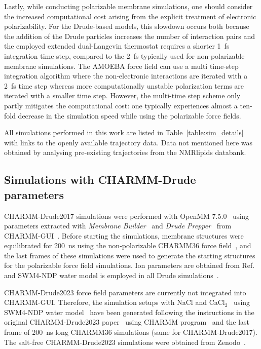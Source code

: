 \documentclass[journal=jctcce,manuscript=article,layout=singlecolumn]{achemso}
\begin{document}
Lastly, while conducting polarizable membrane simulations, one should consider the increased computational cost arising from the explicit treatment of electronic polarizability. For the Drude-based models, this slowdown occurs both because the addition of the Drude particles increases the number of interaction pairs and the employed extended dual-Langevin thermostat requires a shorter 1~fs integration time step, compared to the 2~fs typically used for non-polarizable membrane simulations. The AMOEBA force field can use a multi time-step integration algorithm where the non-electronic interactions are iterated with a 2~fs time step whereas more computationally unstable polarization terms are iterated with a smaller time step. However, the multi-time step scheme  only partly mitigates the computational cost: one typically experiences almost a ten-fold decrease in the simulation speed while using the polarizable force fields. 


All simulations performed in this work are listed in Table~\ref{table:sim_details} with links to the openly available trajectory data. Data not mentioned here was obtained by analysing pre-existing trajectories from the NMRlipids databank.

\subsection{Simulations with CHARMM-Drude parameters}


CHARMM-Drude2017 simulations were performed with OpenMM 7.5.0~\cite{eastman2017openmm} using parameters extracted with \textit{Membrane Builder}~\cite{wu2014charmm,jo2009charmm,jo2007automated,lee2018charmm} and \textit{Drude Prepper}~\cite{kognole2022charmm} from CHARMM-GUI~\cite{jo2008charmm,lee2016charmm}. Before starting the simulations, membrane structures were equilibrated for 200~ns using the non-polarizable CHARMM36 force field~\cite{klauda2010update}, and the last frames of these simulations were used to generate the starting structures for the polarizable force field simulations. Ion parameters are obtained from Ref.~ and SWM4-NDP water model is employed in all Drude simulations~\cite{lamoureux2006polarizable}.

CHARMM-Drude2023 force field parameters are currently not integrated into CHARMM-GUI. Therefore, the simulation setups with NaCl and CaCl$_{2}$~\cite{lin2018polarizable} using SWM4-NDP water model~\cite{lamoureux2006polarizable} have been generated following the instructions in the original CHARMM-Drude2023 paper~\cite{yu2023drude} using CHARMM program~\cite{brooks2009charmm} and the last frame of 200~ns long CHARMM36 simulations (same for CHARMM-Drude2017). The salt-free CHARMM-Drude2023 simulations were obtained from Zenodo~\cite{richard_m_venable_2023_7872447, richard_m_venable_2023_7871949}. 
\end{document}

